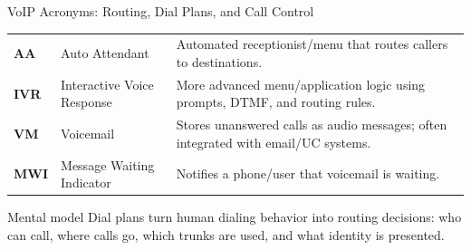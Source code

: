 \documentclass[aspectratio=169]{beamer}
\begin{document}
\begin{frame}{VoIP Acronyms: Routing, Dial Plans, and Call Control}
\begin{tabular}{p{1.8cm} p{3.5cm} p{6.8cm}}
\textbf{AA} & Auto Attendant & Automated receptionist/menu that routes callers to destinations. \\
\textbf{IVR} & Interactive Voice Response & More advanced menu/application logic using prompts, DTMF, and routing rules. \\
\textbf{VM} & Voicemail & Stores unanswered calls as audio messages; often integrated with email/UC systems. \\
\textbf{MWI} & Message Waiting Indicator & Notifies a phone/user that voicemail is waiting. \\
\bottomrule
\end{tabular}

\vspace{0.15cm}

\begin{block}{Mental model}
Dial plans turn human dialing behavior into routing decisions: who can call, where calls go, which trunks are used, and what identity is presented.
\end{block}

\end{frame}
\end{document}
